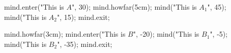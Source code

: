 \usemodule[mindmap]
\startMPpage
mind.enter("This is $A$", 30);
    mind.howfar(5cm);
    mind("This is $A_1$", 45);
    mind("This is $A_2$", 15);
mind.exit;

mind.howfar(3cm);
mind.enter("This is $B$", -20);
    mind("This is $B_1$", -5);
    mind("This is $B_2$", -35);
mind.exit;
\stopMPpage
